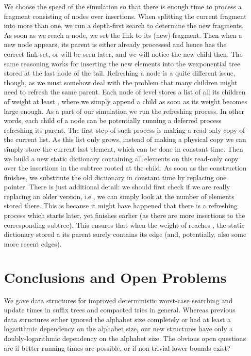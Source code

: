 \documentclass[11pt,onecolumn,final]{article} \usepackage{a4}
\theoremstyle{plain}
\theoremstyle{remark}
\begin{document}
We choose the speed of the simulation so that there is enough time to process a fragment consisting of  nodes over  insertions. When splitting the current fragment into more than one, we run a depth-first search to determine the new fragments. As soon as we reach a node, we set the link to its (new) fragment. Then when a new node appears, its parent is either already processed and hence has the correct link set, or will be seen later, and we will notice the new child then. The same reasoning works for inserting the new elements into the wexponential tree stored at the last node of the tail. Refreshing a node is  a quite different issue, though, as we must somehow deal with the problem that many children might need to refresh the same parent. Each node of level  stores a list of all its children of weight at least , where we simply append a child as soon as its weight becomes large enough. As a part of our simulation we run the refreshing process. In other words, each child of a node can be potentially running a deferred process refreshing its parent. The first step of such process is making a read-only copy of the current list. As this list only grows, instead of making a physical copy we can simply store the current last element, which can be done in constant time. Then we build a new static dictionary containing all elements on this read-only copy over the insertions in the subtree rooted at the child.  As soon as the construction finishes, we substitute the old dictionary in constant time by replacing one pointer. There is just additional detail: we should first check if we are really replacing an older version, i.e., we can simply look at the number of elements stored there. This is because it might have happened that there is a refreshing process which starts later, yet finishes earlier (as there are more insertions to the corresponding subtree). This ensures that when the weight of  reaches , the static dictionary stored a its parent surely contains its edge (and, potentially, also some more recent edges).

\section{Conclusions and Open Problems}
\label{sect:conclusions}
We gave data structures for improved deterministic worst-case searching and update times in suffix trees and compacted tries in general. Whereas previous data structures either ignored the alphabet size completely \cite{andersson07dynamic} or had at least a logarithmic dependency on the alphabet size, our new structures have only a doubly-logarithmic dependency on the alphabet size. The obvious open questions are if better running times are possible, or if non-trivial lower bounds exist?
\end{document}
